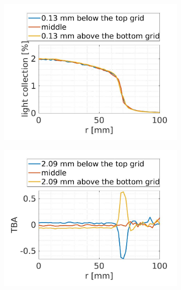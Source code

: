 \begin{figure}[!p]
	\centering
	\begin{subfigure}[b]{\halfwidth}
		\centering
		\includegraphics[width=\textwidth,clip,trim={0 30 0 195}]{Figures/GasTest/LGresult/PDEvsRadiusPTFE040MiddleTopBottomconfig1.jpg}
		\caption{}
		\label{fig:}
	\end{subfigure}
	\begin{subfigure}[b]{\halfwidth}
		\centering
		\includegraphics[width=\textwidth,clip,trim={0 30 0 200}]{Figures/GasTest/LGresult/PDEvsRadiusPTFE040MiddleTopBottomTBAFullconfig1.jpg}%
		\caption{}
		\label{fig:}
	\end{subfigure}


\end{figure}
